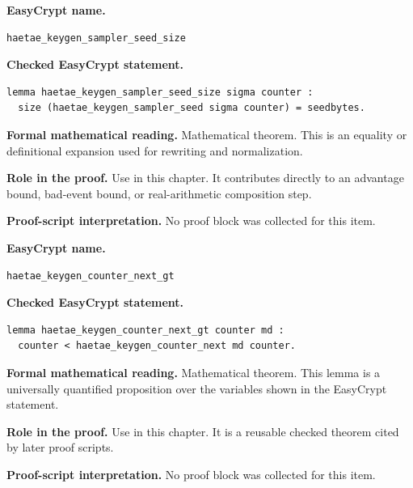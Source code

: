\begin{formaltheorem}
\noindent\textbf{EasyCrypt name.}
\begin{lstlisting}[language=EasyCrypt,basicstyle=\ttfamily\scriptsize]
haetae_keygen_sampler_seed_size
\end{lstlisting}
\noindent\textbf{Checked EasyCrypt statement.}
\begin{lstlisting}[language=EasyCrypt,basicstyle=\ttfamily\scriptsize]
lemma haetae_keygen_sampler_seed_size sigma counter :
  size (haetae_keygen_sampler_seed sigma counter) = seedbytes.
\end{lstlisting}
\noindent\textbf{Formal mathematical reading.}
Mathematical theorem. This is an equality or definitional expansion used for rewriting and normalization.

\noindent\textbf{Role in the proof.}
Use in this chapter. It contributes directly to an advantage bound, bad-event bound, or real-arithmetic composition step.

\noindent\textbf{Proof-script interpretation.}
No proof block was collected for this item.

\end{formaltheorem}

\begin{formaltheorem}
\noindent\textbf{EasyCrypt name.}
\begin{lstlisting}[language=EasyCrypt,basicstyle=\ttfamily\scriptsize]
haetae_keygen_counter_next_gt
\end{lstlisting}
\noindent\textbf{Checked EasyCrypt statement.}
\begin{lstlisting}[language=EasyCrypt,basicstyle=\ttfamily\scriptsize]
lemma haetae_keygen_counter_next_gt counter md :
  counter < haetae_keygen_counter_next md counter.
\end{lstlisting}
\noindent\textbf{Formal mathematical reading.}
Mathematical theorem. This lemma is a universally quantified proposition over the variables shown in the EasyCrypt statement.

\noindent\textbf{Role in the proof.}
Use in this chapter. It is a reusable checked theorem cited by later proof scripts.

\noindent\textbf{Proof-script interpretation.}
No proof block was collected for this item.

\end{formaltheorem}

